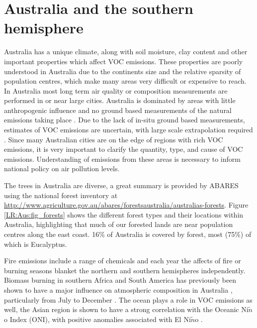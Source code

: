 \section{Australia and the southern hemisphere}
\label{LR:Aus}
  Australia has a unique climate, along with soil moisture, clay content and other important properties which affect VOC emissions.
  These properties are poorly understood in Australia due to the continents size and the relative sparsity of population centres, which make many areas very difficult or expensive to reach.
  In Australia most long term air quality or composition measurements are performed in or near large cities.
  Australia is dominated by areas with little anthropogenic influence and no ground based measurements of the natural emissions taking place \parencite{VanDerA2008}.
  Due to the lack of in-situ ground based measurements, estimates of VOC emissions are uncertain, with large scale extrapolation required \textcite{Millet2006}.
  Since many Australian cities are on the edge of regions with rich VOC emissions, it is very important to clarify the quantity, type, and cause of VOC emissions.
  Understanding of emissions from these areas is necessary to inform national policy on air pollution levels.
  
  The trees in Australia are diverse, a great summary is provided by ABARES using the national forest inventory at  \url{http://www.agriculture.gov.au/abares/forestsaustralia/australias-forests}.
  Figure \ref{LR:Aus:fig_forests} shows the different forest types and their locations within Australia, highlighting that much of our forested lands are near population centres along the east coast.
  16\% of Australia is covered by forest, most (75\%) of which is Eucalyptus.
  
  
  Fire emissions include a range of chemicals and each year the affects of fire or burning seasons blanket the northern and southern hemispheres independently.
  Biomass burning in southern Africa and South America has previously been shown to have a major influence on atmospheric composition in Australia \parencite{Oltmans2001, Gloudemans2006, Edwards2006}, particularly from July to December \parencite{Pak2003, Liu2016}.
  The ocean plays a role in VOC emissions as well, the Asian region is shown to have a strong correlation with the Oceanic Ni$\tilde{n}$o Index (ONI), with positive anomalies associated with El Ni$\tilde{n}$o \parencite{Stavrakou2014}.
  
